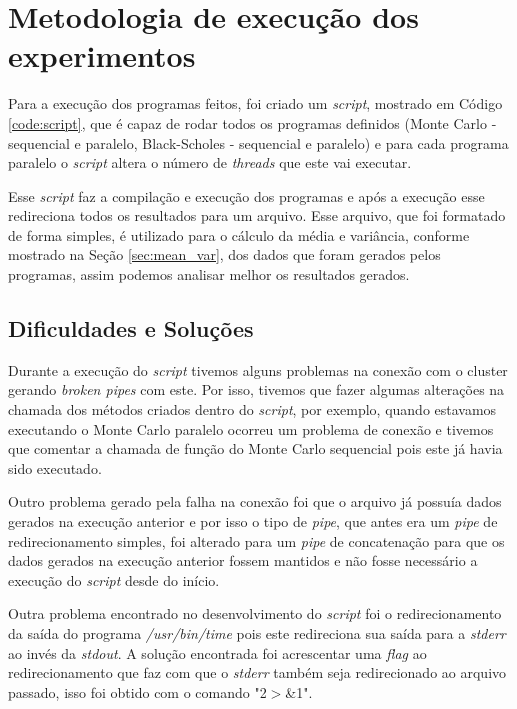\documentclass[11pt,twoside]{article}
\begin{document}
\section{Metodologia de execução dos experimentos}

    Para a execução dos programas feitos, foi criado um \textit{script}, mostrado em Código
    \ref{code:script}, que é capaz de rodar todos os programas definidos (Monte Carlo -
    sequencial e paralelo, Black-Scholes - sequencial e paralelo) e para cada programa paralelo
    o \textit{script} altera o número de \textit{threads} que este vai executar.
    
    Esse \textit{script} faz a compilação e execução dos programas e após a execução esse
    redireciona todos os resultados para um arquivo. Esse arquivo, que foi formatado de forma
    simples, é utilizado para o cálculo da média e variância, conforme mostrado na
    Seção \ref{sec:mean_var}, dos dados que foram gerados pelos programas, assim podemos analisar
    melhor os resultados gerados.
    
    \subsection{Dificuldades e Soluções}

        Durante a execução do \textit{script} tivemos alguns problemas na conexão com o cluster
        gerando \textit{broken pipes} com este. Por isso, tivemos que fazer algumas alterações na
        chamada dos métodos criados dentro do \textit{script}, por exemplo, quando estavamos
        executando o Monte Carlo paralelo ocorreu um problema de conexão e tivemos que comentar
        a chamada de função do Monte Carlo sequencial pois este já havia sido executado.
        
        Outro problema gerado pela falha na conexão foi que o arquivo já possuía dados gerados
        na execução anterior e por isso o tipo de \textit{pipe}, que antes era um \textit{pipe}
        de redirecionamento simples, foi alterado para um \textit{pipe} de concatenação para que
        os dados gerados na execução anterior fossem mantidos e não fosse necessário a execução
        do \textit{script} desde do início.
        
        Outra problema encontrado no desenvolvimento do \textit{script} foi o redirecionamento
        da saída do programa \textit{/usr/bin/time} pois este redireciona sua saída para a
        \textit{stderr} ao invés da \textit{stdout}. A solução encontrada foi acrescentar
        uma \textit{flag} ao redirecionamento que faz com que o \textit{stderr} também seja redirecionado
        ao arquivo passado, isso foi obtido com o comando "2$>$\&1".
    
\end{document}
